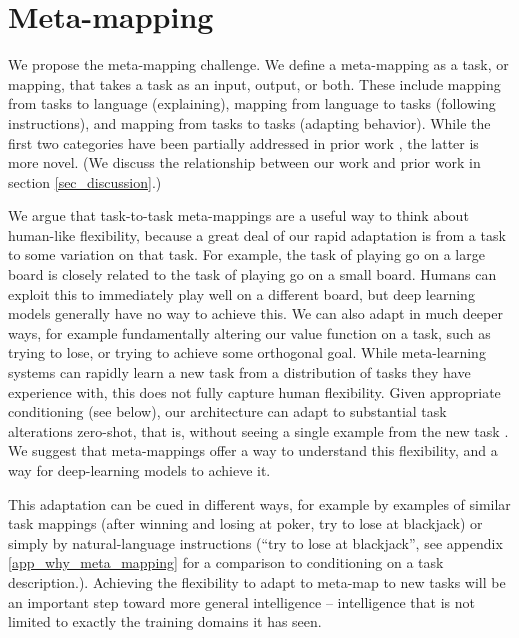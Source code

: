 \documentclass{article}
\begin{document}
\vspace{-0.25em}
\section{Meta-mapping}
\vspace{-0.5em} %
We propose the meta-mapping challenge. We define a meta-mapping as a task, or mapping, that takes a task as an input, output, or both. These include mapping from tasks to language (explaining), mapping from language to tasks (following instructions), and mapping from tasks to tasks (adapting behavior). While the first two categories have been partially addressed in prior work \citep[e.g.][]{Hermann2017, Co-Reyes2019}, the latter is more novel. (We discuss the relationship between our work and prior work in section \ref{sec_discussion}.) \par
We argue that task-to-task meta-mappings are a useful way to think about human-like flexibility, because a great deal of our rapid adaptation is from a task to some variation on that task. For example, the task of playing go on a large board is closely related to the task of playing go on a small board. Humans can exploit this to immediately play well on a different board, but deep learning models generally have no way to achieve this. We can also adapt in much deeper ways, for example fundamentally altering our value function on a task, such as trying to lose, or trying to achieve some orthogonal goal. While meta-learning systems can rapidly learn a new task from a distribution of tasks they have experience with, this does not fully capture human flexibility. Given appropriate conditioning (see below), our architecture can adapt to substantial task alterations zero-shot, that is, without seeing a single example from the new task \citep{Lake2016}. We suggest that meta-mappings offer a way to understand this flexibility, and a way for deep-learning models to achieve it.\par
This adaptation can be cued in different ways, for example by examples of similar task mappings (after winning and losing at poker, try to lose at blackjack) or simply by natural-language instructions (``try to lose at blackjack'', see appendix \ref{app_why_meta_mapping} for a comparison to conditioning on a task description.). Achieving the flexibility to adapt to meta-map to new tasks will be an important step toward more general intelligence -- intelligence that is not limited to exactly the training domains it has seen. \par 
\end{document}
